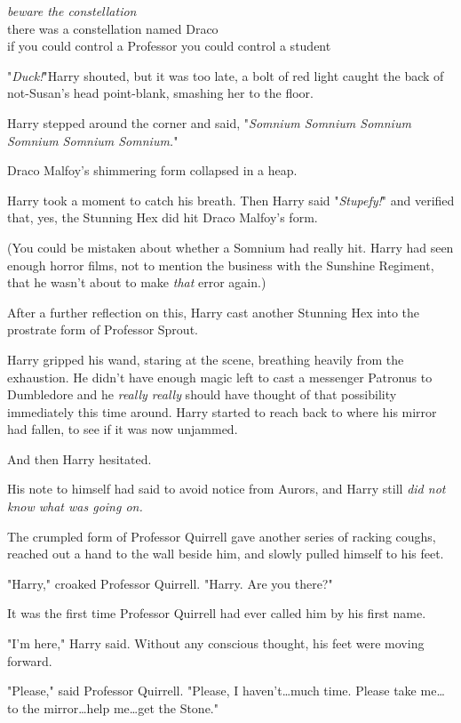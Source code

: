 \noindent{}\emph{beware the constellation}\\
there was a constellation named Draco\\
if you could control a Professor you could control a student

"\emph{Duck!}"Harry shouted, but it was too late, a bolt of red light caught
the back of not-Susan's head point-blank, smashing her to the floor.

Harry stepped around the corner and said, "\emph{Somnium Somnium Somnium
Somnium Somnium Somnium.}"

Draco Malfoy's shimmering form collapsed in a heap.

Harry took a moment to catch his breath. Then Harry said "\emph{Stupefy!}" and
verified that, yes, the Stunning Hex did hit Draco Malfoy's form.

(You could be mistaken about whether a Somnium had really hit. Harry had seen
enough horror films, not to mention the business with the Sunshine Regiment,
that he wasn't about to make \emph{that} error again.)

After a further reflection on this, Harry cast another Stunning Hex into the
prostrate form of Professor Sprout.

Harry gripped his wand, staring at the scene, breathing heavily from the
exhaustion. He didn't have enough magic left to cast a messenger Patronus to
Dumbledore and he \emph{really really} should have thought of that possibility
immediately this time around. Harry started to reach back to where his mirror
had fallen, to see if it was now unjammed.

And then Harry hesitated.

His note to himself had said to avoid notice from Aurors, and Harry still
\emph{did not know what was going on.}

The crumpled form of Professor Quirrell gave another series of racking coughs,
reached out a hand to the wall beside him, and slowly pulled himself to his
feet.

"Harry," croaked Professor Quirrell. "Harry. Are you there?"

It was the first time Professor Quirrell had ever called him by his first name.

"I'm here," Harry said. Without any conscious thought, his feet were moving
forward.

"Please," said Professor Quirrell. "Please, I haven't…much time. Please
take me…to the mirror…help me…get the Stone."

